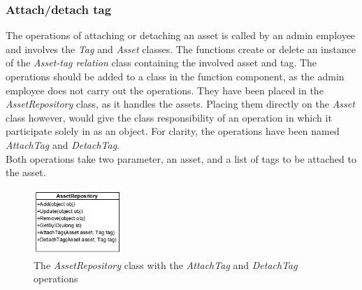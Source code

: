 \subsubsection{Attach/detach tag}
The operations of attaching or detaching an asset is called by an admin employee and involves the \textit{Tag} and \textit{Asset} classes. The functions create or delete an instance of the \textit{Asset-tag relation} class containing the involved asset and tag. The operations should be added to a class in the function component, as the admin employee does not carry out the operations. They have been placed in the \textit{AssetRepository} class, as it handles the assets. Placing them directly on the \textit{Asset} class however, would give the class responsibility of an operation in which it participate solely in as an object. For clarity, the operations have been named \textit{AttachTag} and \textit{DetachTag}.\\
Both operations take two parameter, an asset, and a list of tags to be attached to the asset.
\begin{figure}[H]
    \centering
    \includegraphics[width=0.3\textwidth]{figures/FunctionComponent/AttachTag.png}
    \caption{The \textit{AssetRepository} class with the \textit{AttachTag} and \textit{DetachTag} operations}
    \label{fig:AttachDetachTag}
\end{figure}

